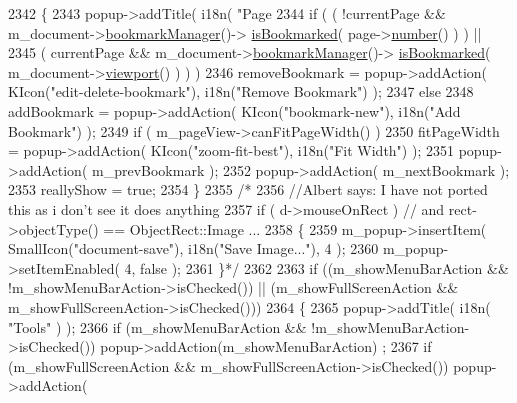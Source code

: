 \begin{DoxyCode}
2342     \{
2343         popup->addTitle( i18n( \textcolor{stringliteral}{"Page %
2344         \textcolor{keywordflow}{if} ( ( !currentPage && m\_document->\hyperlink{classOkular_1_1Document_a2a2a1f0f5384563c8b24c2ba48809839}{bookmarkManager}()->
      \hyperlink{classOkular_1_1BookmarkManager_a606808f318c721de3e0d4954e7f84a35}{isBookmarked}( page->\hyperlink{classOkular_1_1Page_a6eee5f157a130b47d81ddd63e501664b}{number}() ) ) ||
2345                 ( currentPage && m\_document->\hyperlink{classOkular_1_1Document_a2a2a1f0f5384563c8b24c2ba48809839}{bookmarkManager}()->
      \hyperlink{classOkular_1_1BookmarkManager_a606808f318c721de3e0d4954e7f84a35}{isBookmarked}( m\_document->\hyperlink{classOkular_1_1Document_abb8738de0a53aa4a9f552de0e1e749f8}{viewport}() ) ) )
2346             removeBookmark = popup->addAction( KIcon(\textcolor{stringliteral}{"edit-delete-bookmark"}), i18n(\textcolor{stringliteral}{"Remove Bookmark"}) );
2347         \textcolor{keywordflow}{else}
2348             addBookmark = popup->addAction( KIcon(\textcolor{stringliteral}{"bookmark-new"}), i18n(\textcolor{stringliteral}{"Add Bookmark"}) );
2349         \textcolor{keywordflow}{if} ( m\_pageView->canFitPageWidth() )
2350             fitPageWidth = popup->addAction( KIcon(\textcolor{stringliteral}{"zoom-fit-best"}), i18n(\textcolor{stringliteral}{"Fit Width"}) );
2351         popup->addAction( m\_prevBookmark );
2352         popup->addAction( m\_nextBookmark );
2353         reallyShow = \textcolor{keyword}{true};
2354     \}
2355     \textcolor{comment}{/*}
2356 \textcolor{comment}{        //Albert says: I have not ported this as i don't see it does anything}
2357 \textcolor{comment}{        if ( d->mouseOnRect ) // and rect->objectType() == ObjectRect::Image ...}
2358 \textcolor{comment}{        \{}
2359 \textcolor{comment}{            m\_popup->insertItem( SmallIcon("document-save"), i18n("Save Image..."), 4 );}
2360 \textcolor{comment}{            m\_popup->setItemEnabled( 4, false );}
2361 \textcolor{comment}{    \}*/}
2362 
2363     \textcolor{keywordflow}{if} ((m\_showMenuBarAction && !m\_showMenuBarAction->isChecked()) || (m\_showFullScreenAction && 
      m\_showFullScreenAction->isChecked()))
2364     \{
2365         popup->addTitle( i18n( \textcolor{stringliteral}{"Tools"} ) );
2366         \textcolor{keywordflow}{if} (m\_showMenuBarAction && !m\_showMenuBarAction->isChecked()) popup->addAction(m\_showMenuBarAction)
      ;
2367         \textcolor{keywordflow}{if} (m\_showFullScreenAction && m\_showFullScreenAction->isChecked()) popup->addAction(
}
\end{DoxyCode}
